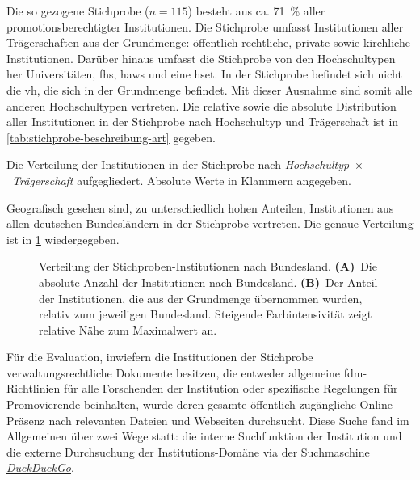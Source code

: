 Die so gezogene Stichprobe ($n=115$) besteht aus ca. \SI{71}{\percent} aller promotionsberechtigter Institutionen.
Die Stichprobe umfasst Institutionen aller Trägerschaften aus der Grundmenge: öffentlich-rechtliche, private sowie kirchliche Institutionen.
Darüber hinaus umfasst die Stichprobe von den Hochschultypen her Universitäten, \glspl{fh}, \glspl{haw} und eine \gls{hset}.
In der Stichprobe befindet sich nicht die \gls{vh}, die sich in der Grundmenge befindet.
Mit dieser Ausnahme sind somit alle anderen Hochschultypen vertreten.
Die relative sowie die absolute Distribution aller Institutionen in der Stichprobe nach Hochschultyp und Trägerschaft ist in \cref{tab:stichprobe-beschreibung-art} gegeben.
\begin{table}[!htbp]
	\caption{Die Verteilung der Institutionen in der Stichprobe nach \textit{Hochschultyp}~$\times$~\textit{Trägerschaft} aufgegliedert. Absolute Werte in Klammern angegeben.}
    
	\label{tab:stichprobe-beschreibung-art}
\end{table}

\noindent Geografisch gesehen sind, zu unterschiedlich hohen Anteilen, Institutionen aus allen deutschen Bundesländern in der Stichprobe vertreten.
Die genaue Verteilung ist in \cref{fig:DE-stichprobe-beschreibung} wiedergegeben.
\begin{figure}[!htbp]
    \centering
    
    \caption{Verteilung der Stichproben-Institutionen nach Bundesland. \textbf{(A)}~Die absolute Anzahl der Institutionen nach Bundesland.
    \textbf{(B)}~Der Anteil der Institutionen, die aus der Grundmenge übernommen wurden, relativ zum jeweiligen Bundesland.
    Steigende Farbintensivität zeigt relative Nähe zum Maximalwert an.}
    \label{fig:DE-stichprobe-beschreibung}
\end{figure}

Für die Evaluation, inwiefern die Institutionen der Stichprobe verwaltungsrechtliche Dokumente besitzen, die entweder allgemeine \gls{fdm}-Richtlinien für alle Forschenden der Institution oder spezifische Regelungen für Promovierende beinhalten, wurde deren gesamte öffentlich zugängliche Online-Präsenz nach relevanten Dateien und Webseiten durchsucht.
Diese Suche fand im Allgemeinen über zwei Wege statt:
die interne Suchfunktion der Institution und die externe Durchsuchung der Institutions-Domäne via der Suchmaschine \href{https://www.duckduckgo.com/}{\textit{DuckDuckGo}}.


